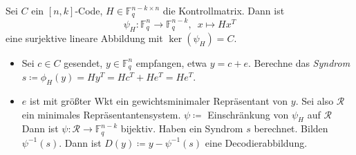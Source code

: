 \documentclass{cheat-sheet}
\newcommand{\F}{\mathbb{F}} %
\begin{document}
\begin{alg}
  Sei $C$ ein $[n,k]$-Code, $H \in \F_q^{n-k \times n}$ die Kontrollmatrix.
  Dann ist
  \[ \psi_H : \F_q^n \to \F_q^{n-k}, \enspace x \mapsto H x^T \]
  eine surjektive lineare Abbildung mit $\ker(\psi_H) = C$.
  \begin{itemize}
    \item Sei $c \in C$ gesendet, $y \in \F_q^n$ empfangen, etwa $y = c + e$.
    Berechne das \emph{Syndrom} $s \coloneqq \phi_H(y) = H y^T = H c^T + H e^T = H e^T$.
    \item $e$ ist mit größter Wkt ein gewichtsminimaler Repräsentant von $y$.
    Sei also $\mathcal{R}$ ein minimales Repräsentantensystem.
    $\psi \coloneqq $ Einschränkung von $\psi_H$ auf $\mathcal{R}$
    Dann ist $\psi : \mathcal{R} \to \F_q^{n-k}$ bijektiv.
    Haben ein Syndrom $s$ berechnet. Bilden $\psi^{-1}(s)$.
    Dann ist $D(y) \coloneqq y - \psi^{-1}(s)$ eine Decodierabbildung.
  \end{itemize}
\end{alg}
\end{document}
